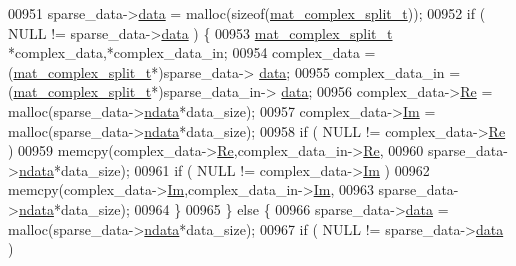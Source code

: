 \begin{DoxyCode}
{{{{{{{{{{{{{{{{{{{{{{00951                 sparse\_data->\hyperlink{group___m_a_t_ae2c648cb9eac4ce47f26cddb44246152}{data} = malloc(\textcolor{keyword}{sizeof}(\hyperlink{group___m_a_t_structmat__complex__split__t}{mat\_complex\_split\_t}));
00952                 \textcolor{keywordflow}{if} ( NULL != sparse\_data->\hyperlink{group___m_a_t_ae2c648cb9eac4ce47f26cddb44246152}{data} ) \{
00953                     \hyperlink{group___m_a_t_structmat__complex__split__t}{mat\_complex\_split\_t} *complex\_data,*complex\_data\_in;
00954                     complex\_data     = (\hyperlink{group___m_a_t_structmat__complex__split__t}{mat\_complex\_split\_t}*)sparse\_data->
      \hyperlink{group___m_a_t_ae2c648cb9eac4ce47f26cddb44246152}{data};
00955                     complex\_data\_in  = (\hyperlink{group___m_a_t_structmat__complex__split__t}{mat\_complex\_split\_t}*)sparse\_data\_in->
      \hyperlink{group___m_a_t_ae2c648cb9eac4ce47f26cddb44246152}{data};
00956                     complex\_data->\hyperlink{group___m_a_t_a484a93607508adac2bce53a0252e0325}{Re} = malloc(sparse\_data->\hyperlink{group___m_a_t_a1beb8a8c58a808207cbea650563a9b63}{ndata}*data\_size);
00957                     complex\_data->\hyperlink{group___m_a_t_a7182d10b0d3598415887376065440946}{Im} = malloc(sparse\_data->\hyperlink{group___m_a_t_a1beb8a8c58a808207cbea650563a9b63}{ndata}*data\_size);
00958                     \textcolor{keywordflow}{if} ( NULL != complex\_data->\hyperlink{group___m_a_t_a484a93607508adac2bce53a0252e0325}{Re} )
00959                         memcpy(complex\_data->\hyperlink{group___m_a_t_a484a93607508adac2bce53a0252e0325}{Re},complex\_data\_in->\hyperlink{group___m_a_t_a484a93607508adac2bce53a0252e0325}{Re},
00960                                sparse\_data->\hyperlink{group___m_a_t_a1beb8a8c58a808207cbea650563a9b63}{ndata}*data\_size);
00961                     \textcolor{keywordflow}{if} ( NULL != complex\_data->\hyperlink{group___m_a_t_a7182d10b0d3598415887376065440946}{Im} )
00962                         memcpy(complex\_data->\hyperlink{group___m_a_t_a7182d10b0d3598415887376065440946}{Im},complex\_data\_in->\hyperlink{group___m_a_t_a7182d10b0d3598415887376065440946}{Im},
00963                                sparse\_data->\hyperlink{group___m_a_t_a1beb8a8c58a808207cbea650563a9b63}{ndata}*data\_size);
00964                 \}
00965             \} \textcolor{keywordflow}{else} \{
00966                 sparse\_data->\hyperlink{group___m_a_t_ae2c648cb9eac4ce47f26cddb44246152}{data} = malloc(sparse\_data->\hyperlink{group___m_a_t_a1beb8a8c58a808207cbea650563a9b63}{ndata}*data\_size);
00967                 \textcolor{keywordflow}{if} ( NULL != sparse\_data->\hyperlink{group___m_a_t_ae2c648cb9eac4ce47f26cddb44246152}{data} )
}}}}}}}}}}}}}}}}}}}}}}
\end{DoxyCode}
